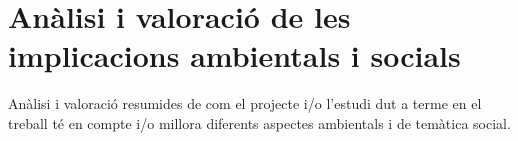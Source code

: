 \chapter{Anàlisi i valoració de les implicacions ambientals i socials}

Anàlisi i valoració resumides de com el projecte i/o l’estudi dut a terme en el treball té en compte i/o millora diferents aspectes ambientals i de temàtica social.
